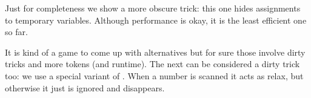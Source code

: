 \startbuffer[c][option=TEX]
\stopbuffer

\typebuffer[c][option=TEX] \getbuffer[c,b]

Just for completeness we show a more obscure trick: this one hides assignments to
temporary variables. Although performance is okay, it is the least efficient
one so far.

\ifdefined\beginlocalcontrol

\startbuffer[c][option=TEX]
\stopbuffer

\typebuffer[c][option=TEX] \getbuffer[c,b]

\fi

It is kind of a game to come up with alternatives but for sure those involve
dirty tricks and more tokens (and runtime). The next can be considered a dirty
trick too: we use a special variant of \type {\relax}. When a number is scanned
it acts as relax, but otherwise it just is ignored and disappears.

\ifdefined\norelax\else\let\norelax\relax\fi

\startbuffer[c][option=TEX]
\stopbuffer

\typebuffer[c][option=TEX] \getbuffer[c,b]

\stopsectionlevel

\popoverloadmode

\stopdocument







